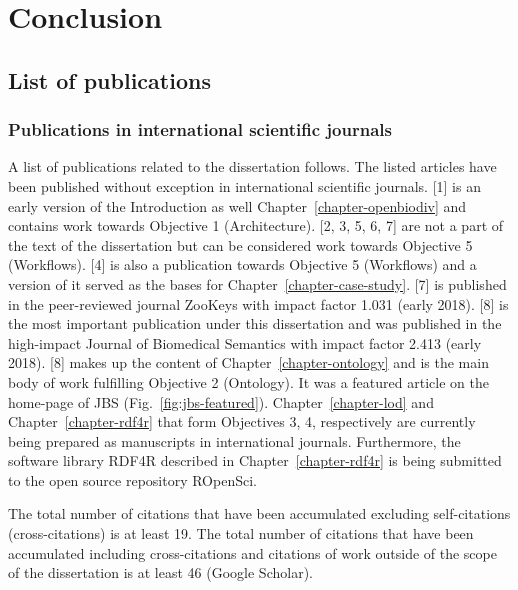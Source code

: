 \chapter*{Conclusion}
\label{chapter:summary}

\section*{List of publications}

\subsection*{Publications in international scientific journals}

A list of publications related to the dissertation follows. The listed articles have been published without exception in international scientific journals. [1] is an early version of the Introduction as well Chapter~\ref{chapter-openbiodiv} and contains work towards Objective 1 (Architecture). [2, 3, 5, 6, 7] are not a part of the text of the dissertation but can be considered work towards Objective 5 (Workflows). [4] is also a publication towards Objective 5 (Workflows) and a version of it served as the bases for Chapter~\ref{chapter-case-study}. [7] is published in the peer-reviewed journal ZooKeys with impact factor 1.031 (early 2018). [8] is the most important publication under this dissertation and was published in the high-impact Journal of Biomedical Semantics with impact factor 2.413 (early 2018). [8] makes up the content of Chapter~\ref{chapter-ontology} and is the main body of work fulfilling Objective 2 (Ontology). It was a featured article on the home-page of JBS (Fig.~\ref{fig:jbs-featured}). Chapter~\ref{chapter-lod} and Chapter~\ref{chapter-rdf4r} that form Objectives 3, 4, respectively are currently being prepared as manuscripts in international journals. Furthermore, the software library RDF4R described in Chapter~\ref{chapter-rdf4r} is being submitted to the open source repository ROpenSci.

The total number of citations that have been accumulated excluding self-citations (cross-citations) is at least 19. The total number of citations that have been accumulated including cross-citations and citations of work outside of the scope of the dissertation is at least 46 (Google Scholar).

